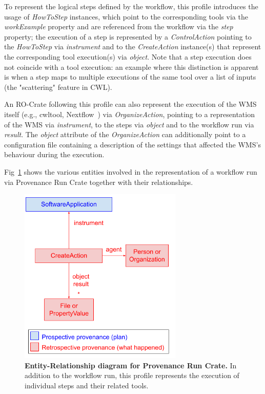 \documentclass[10pt,letterpaper]{article}
\begin{document}
To represent the logical steps defined by the workflow, this profile introduces the usage of \emph{HowToStep} instances, which point to the corresponding tools via the \emph{workExample} property and are referenced from the workflow via the \emph{step} property; the execution of a step is represented by a \emph{ControlAction} pointing to the
\emph{HowToStep} via \emph{instrument} and to the \emph{CreateAction}
instance(s) that represent the corresponding tool execution(s) via
\emph{object}.
Note that a step execution does not coincide with a tool execution: an example where this distinction is apparent is when a step maps to multiple executions of the same tool over a list of inputs (the "scattering" feature in CWL).

An RO-Crate following this profile can also represent the execution of the WMS itself (e.g., cwltool, Nextflow~\cite{Di Tommaso 2017}) via
\emph{OrganizeAction}, pointing to a representation of the WMS via
\emph{instrument}, to the steps via \emph{object} and to the workflow run via \emph{result}.
The \emph{object} attribute of the
\emph{OrganizeAction} can additionally point to a configuration file containing a description of the settings that affected the WMS's behaviour during the execution.

Fig~\ref{fig:provenance_crate_er} shows the various entities involved in the representation of a workflow run via Provenance Run Crate together with their relationships.

\begin{figure}[!h]
\includegraphics[width=21em]{image4.png}
\caption{{\bf Entity-Relationship diagram for Provenance Run Crate.}
In addition to the workflow run, this profile represents the execution of individual steps and their related tools.}
\label{fig:provenance_crate_er}
\end{figure}
\end{document}
